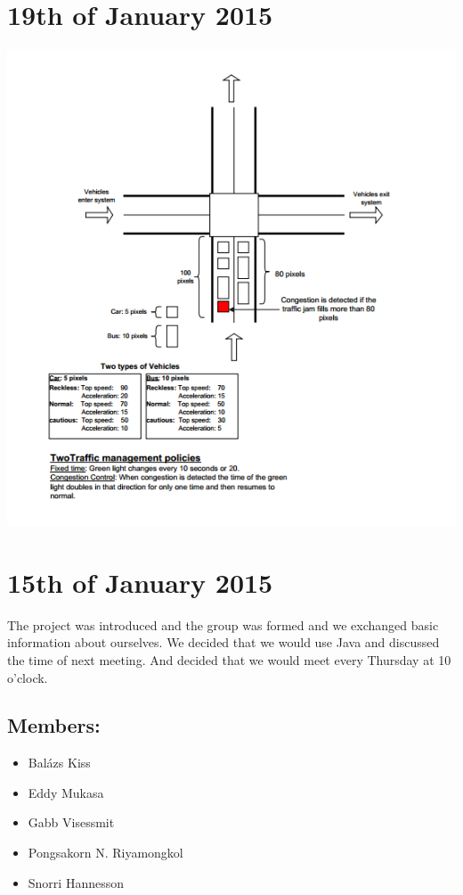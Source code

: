 \documentclass[11pt]{article}
\begin{document}
\newpage

\section{19th of January 2015}
\includegraphics{meeting2}
\newpage

\section{15th of January 2015}
The project was introduced and the group was formed and we exchanged basic information about ourselves. We decided that we would use Java and discussed the time of next meeting. And decided that we would meet every Thursday at 10 o'clock.
\subsection{Members:}
\begin{itemize}
\item Balázs Kiss
\item Eddy Mukasa
\item Gabb Visessmit
\item Pongsakorn N. Riyamongkol
\item Snorri Hannesson
\end{itemize}
\newpage
\end{document}
